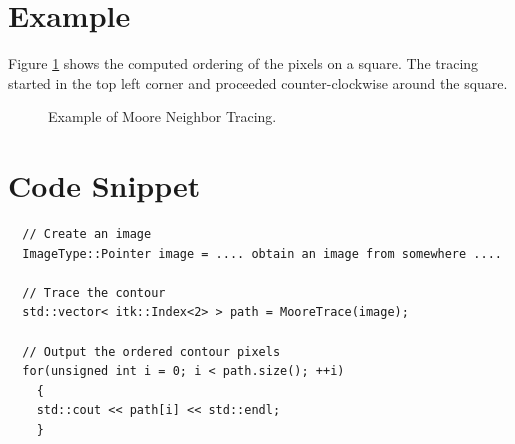 \documentclass{InsightArticle}
\begin{document}
\section{Example}
Figure \ref{fig:Example} shows the computed ordering of the pixels on a square. The tracing started in the top left corner and proceeded counter-clockwise around the square.

\begin{figure}[H]
\centering
{}
\caption{Example of Moore Neighbor Tracing.}
\label{fig:Example}
\end{figure}

\section{Code Snippet}

\begin{verbatim}
  // Create an image
  ImageType::Pointer image = .... obtain an image from somewhere ....
  
  // Trace the contour
  std::vector< itk::Index<2> > path = MooreTrace(image);
  
  // Output the ordered contour pixels
  for(unsigned int i = 0; i < path.size(); ++i)
    {
    std::cout << path[i] << std::endl;
    }
\end{verbatim}
\end{document}

